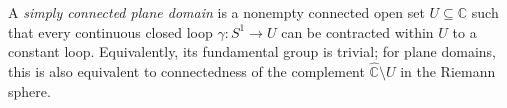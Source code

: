 
A \emph{simply connected plane domain} is a nonempty connected open set $U\subseteq\mathbb C$ such that every continuous closed loop $\gamma:S^1\to U$ can be contracted within $U$ to a constant loop. Equivalently, its fundamental group is trivial; for plane domains, this is also equivalent to connectedness of the complement $\widehat{\mathbb C}\setminus U$ in the Riemann sphere.
